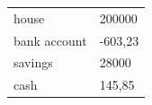 \documentclass{article}
\begin{document}
\begin{tabular}{lf}
house & 200000 \\
bank account & -603,23 \\
savings & 28000 \\
cash & 145,85
\end{tabular}
\end{document}
